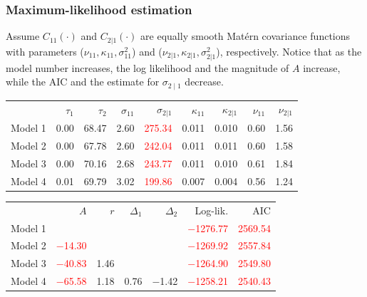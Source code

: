 \documentclass{beamer}
\newcommand{\red}{\textcolor{red}}%
\begin{document}
\begin{frame}
\frametitle{Maximum-likelihood estimation}
\vspace{-.5cm}
Assume $C_{11}(\cdot)$ and $C_{2|1}(\cdot)$ are equally smooth Mat{\'e}rn covariance functions with parameters ($\nu_{11}, \kappa_{11}, \sigma_{11}^2$) and ($\nu_{2|1},\kappa_{2|1},\sigma_{2|1}^2$), respectively. Notice that as the model number increases, the log likelihood and the magnitude of $A$ increase, while the AIC and the estimate for $\sigma_{2\mid 1}$ decrease.
\footnotesize

\begin{tabular}{rrrrrrrrr}
  & $\tau_1$ & $\tau_2$ & $\sigma_{11}$ & $\sigma_{2|1}$ & $\kappa_{11}$ & $\kappa_{2|1}$ & $\nu_{11}$ & $\nu_{2|1}$\vspace{0.07in}\\ 
Model 1 & 0.00 & 68.47 & 2.60 & \red{275.34} & 0.011 & 0.010 & 0.60 & 1.56   \\ 
  Model 2 & 0.00 & 67.78 & 2.60 & \red{242.04} & 0.011 & 0.011 & 0.60 & 1.58 \\ 
  Model 3 & 0.00 & 70.16 & 2.68 & \red{243.77} & 0.011 & 0.010 & 0.61 & 1.84 \\ 
  Model 4 & 0.01 & 69.79 & 3.02 & \red{199.86} & 0.007 & 0.004 & 0.56 & 1.24 \\ 
  \end{tabular}

\begin{tabular}{rrrrrrr}
  &  $A$ & $r$ & $\Delta_1$ & $\Delta_2$ & Log-lik. & AIC\vspace{0.07in}\\ 
Model 1 &  &  &  & & \red{$-$1276.77} & \red{2569.54} \\ 
  Model 2 & \red{$-$14.30} &  &  &  & \red{$-$1269.92} & \red{2557.84} \\ 
  Model 3 & \red{$-$40.83} & 1.46 &  &  & \red{$-$1264.90} & \red{2549.80} \\ 
  Model 4 & \red{$-$65.58} & 1.18 & 0.76 & $-$1.42 & \red{$-$1258.21} &  \red{2540.43}\\ 
  \end{tabular}


\normalsize
\end{frame}

\end{document}

